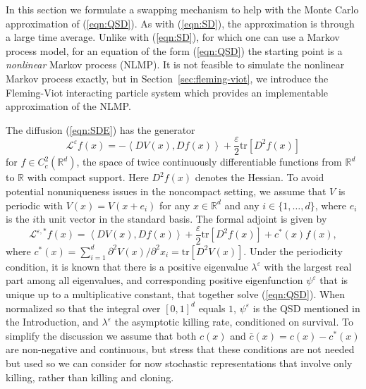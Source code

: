 \documentclass[english,11pt]{article}%
\numberwithin{equation}{section}
\numberwithin{example}{section}
\numberwithin{theorem}{section}
\begin{document}
\label{sec:2}

\label{sec:nonlinearMPswap} In this section we formulate a
swapping mechanism to help with the Monte Carlo approximation of
(\ref{eqn:QSD}). As with (\ref{eqn:SD}), the approximation is through a large
time average. Unlike with (\ref{eqn:SD}), for which one can use a Markov
process model, for an equation of the form (\ref{eqn:QSD}) the starting point
is a \emph{nonlinear} Markov process (NLMP). It is not feasible to simulate the nonlinear Markov process exactly, but in Section~\ref{sec:fleming-viot}, we introduce the Fleming-Viot interacting particle system which provides an implementable approximation of the NLMP. 

The diffusion (\ref{eqn:SDE}) has the generator
\[
\mathcal{L}^{\varepsilon}f(x)=-\left\langle DV(x),Df(x)\right\rangle
+\frac{\varepsilon}{2}\text{tr}[D^{2}f(x)]
\]
for $f\in C_{c}^{2}(\mathbb{R}^{d})$, the space of twice continuously
differentiable functions from $\mathbb{R}^{d}$ to $\mathbb{R}$ with compact
support. Here $D^{2}f(x)$ denotes the Hessian. To avoid potential
nonuniqueness issues in the noncompact setting, we assume that $V$ is periodic
with $V(x)=V(x+e_{i})$ for any $x\in\mathbb{R}^{d}$ and any $i\in
\{1,\ldots,d\}$, where $e_{i}$ is the $i$th unit vector in the standard basis.
The formal adjoint is given by
\[
\mathcal{L}^{\varepsilon,\ast}f(x)=\left\langle DV(x),Df(x)\right\rangle
+\frac{\varepsilon}{2}\text{tr}[D^{2}f(x)]+c^{\ast}(x)f(x),
\]
where $c^{\ast}(x)=%
{\textstyle\sum\nolimits_{i=1}^{d}}
\partial^{2}V(x)/\partial^{2}x_{i}=\mbox{tr}[D^{2}V(x)]$. Under the
periodicity condition, it is known that there is a positive eigenvalue
$\lambda^{\varepsilon}$ with the largest real part among all eigenvalues, and
corresponding positive eigenfunction $\psi^{\varepsilon}$ that is unique up to
a multiplicative constant, that together solve (\ref{eqn:QSD}). When
normalized so that the integral over $[0,1]^{d}$ equals $1$, $\psi
^{\varepsilon}$ is the QSD mentioned in the Introduction, and $\lambda
^{\varepsilon}$ the asymptotic killing rate, conditioned on survival. To
simplify the discussion we assume that both $c(x)$ and $\bar{c}%
(x)=c(x)-c^{\ast}(x)$ are non-negative and continuous, but stress that these
conditions are not needed but used so we can consider for now stochastic
representations that involve only killing, rather than killing and cloning.
\end{document}
